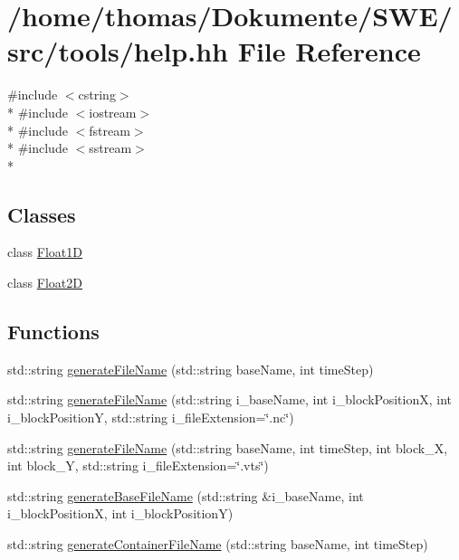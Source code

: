 \hypertarget{help_8hh}{\section{/home/thomas/\-Dokumente/\-S\-W\-E/src/tools/help.hh File Reference}
\label{help_8hh}
}
{\ttfamily \#include $<$cstring$>$}\\*
{\ttfamily \#include $<$iostream$>$}\\*
{\ttfamily \#include $<$fstream$>$}\\*
{\ttfamily \#include $<$sstream$>$}\\*
\subsection*{Classes}
\begin{DoxyCompactItemize}
\item 
class \hyperlink{classFloat1D}{Float1\-D}
\item 
class \hyperlink{classFloat2D}{Float2\-D}
\end{DoxyCompactItemize}
\subsection*{Functions}
\begin{DoxyCompactItemize}
\item 
std\-::string \hyperlink{help_8hh_aa10dc278c6ac60f9cd49955cbe16fbcb}{generate\-File\-Name} (std\-::string base\-Name, int time\-Step)
\item 
std\-::string \hyperlink{help_8hh_a206f33ce37fa47f8635d02a1cfc9881f}{generate\-File\-Name} (std\-::string i\-\_\-base\-Name, int i\-\_\-block\-Position\-X, int i\-\_\-block\-Position\-Y, std\-::string i\-\_\-file\-Extension=\char`\"{}.nc\char`\"{})
\item 
std\-::string \hyperlink{help_8hh_ab05bce4e4d30d0b9fb85f81668f98f79}{generate\-File\-Name} (std\-::string base\-Name, int time\-Step, int block\-\_\-\-X, int block\-\_\-\-Y, std\-::string i\-\_\-file\-Extension=\char`\"{}.vts\char`\"{})
\item 
std\-::string \hyperlink{help_8hh_a7dc37444a6b7771aefff04a38e74e086}{generate\-Base\-File\-Name} (std\-::string \&i\-\_\-base\-Name, int i\-\_\-block\-Position\-X, int i\-\_\-block\-Position\-Y)
\item 
std\-::string \hyperlink{help_8hh_a427928180ec14bf889c55e5cc51d8e36}{generate\-Container\-File\-Name} (std\-::string base\-Name, int time\-Step)
\end{DoxyCompactItemize}


